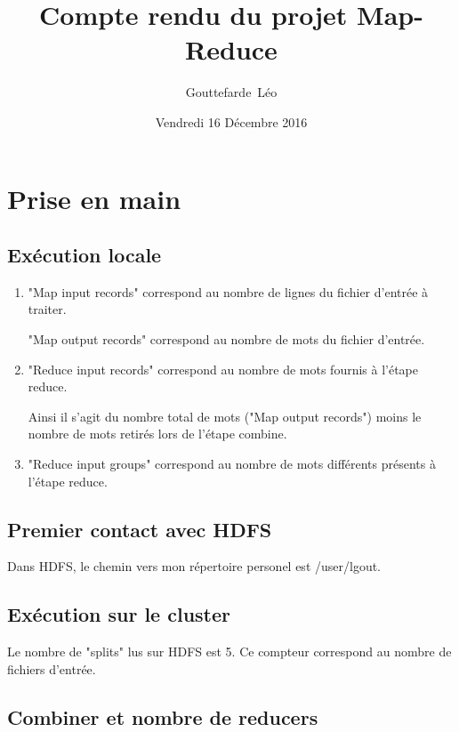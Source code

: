\documentclass[a4paper, 11pt, titlepage]{article}
\title {{ {\huge Compte rendu du projet Map-Reduce }} }
\author{ {\sc Gouttefarde}~Léo }
\date{Vendredi 16 Décembre 2016}
\begin{document}
\pagestyle{fancy}
\maketitle

\setcounter{tocdepth}{2}

\tableofcontents
\newpage

\section {Prise en main}

\subsection {Exécution locale}

\begin{enumerate}

\item
"Map input records" correspond au nombre de lignes du fichier d'entrée à traiter.

"Map output records" correspond au nombre de mots du fichier d'entrée.

\item
"Reduce input records" correspond au nombre de mots fournis à l'étape reduce.

Ainsi il s'agit du nombre total de mots ("Map output records") moins le nombre de mots retirés lors de l'étape combine.

\item
"Reduce input groups" correspond au nombre de mots différents présents à l'étape reduce.

\end{enumerate}


\subsection {Premier contact avec HDFS}

Dans HDFS, le chemin vers mon répertoire personel est /user/lgout.


\subsection {Exécution sur le cluster}

Le nombre de "splits" lus sur HDFS est 5. Ce compteur correspond au nombre de fichiers d'entrée.



\subsection {Combiner et nombre de reducers}
\end{document}
